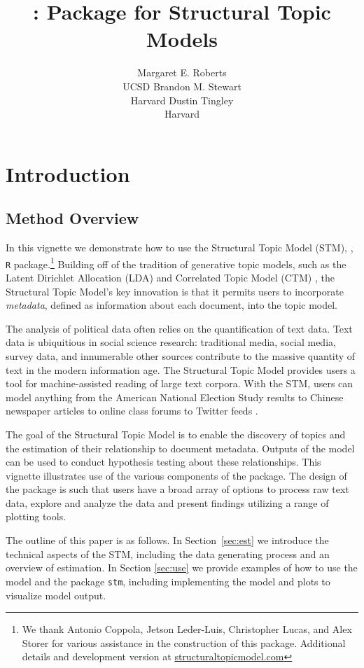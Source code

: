 \documentclass[nojss]{jss}
\author{\hspace{1.1in}Margaret E. Roberts\\\hspace{1.1in}UCSD \And
  \hspace{1.5in}Brandon M. Stewart\\\hspace{1.5in}Harvard \And
  \hspace{1.5in}Dustin Tingley\\\hspace{1.5in}Harvard \And
}
\title{\pkg{stm}: \proglang{R} Package for Structural Topic Models}
\newcommand\spacingset[1]{\renewcommand{\baselinestretch}{#1}\small\normalsize}
\begin{document}

\spacingset{1.5}

\section{Introduction}
\subsection{Method Overview}

In this vignette we demonstrate how to use the Structural Topic Model (STM), , \texttt{R} package.\footnote{We thank Antonio Coppola, Jetson Leder-Luis, Christopher Lucas, and Alex Storer for various assistance in the construction of this package.  Additional details and development version at \url{structuraltopicmodel.com}} Building off of the tradition of generative topic models, such as the Latent Dirichlet Allocation (LDA) \citep{blei2003latent} and Correlated Topic Model (CTM) \citep{blei2007correlated}, the Structural Topic Model's key innovation is that it permits users to incorporate \emph{metadata}, defined as information about each document, into the topic model.

The analysis of political data often relies on the quantification of text data. Text data is ubiquitious in social science research: traditional media, social media, survey data, and innumerable other sources contribute to the massive quantity of text in the modern information age.  The Structural Topic Model provides users a tool for machine-assisted reading of large text corpora.  With the STM, users can model anything from the American National Election Study results \citep{ajps} to Chinese newspaper articles \citep{robertsstewartchina} to online class forums \cite{StudentText} to Twitter feeds \citep{TextComparative}.

The goal of the Structural Topic Model is to enable the discovery of topics and the estimation of their relationship to document metadata. Outputs of the model can be used to conduct hypothesis testing about these relationships. This vignette illustrates use of the various components of the package. The design of the package is such that users have a broad array of options to process raw text data, explore and analyze the data and present findings utilizing a range of plotting tools.

The outline of this paper is as follows. In Section~\ref{sec:est} we introduce the technical aspects of the STM, including the data generating process and an overview of estimation.  In Section \ref{sec:use} we provide examples of how to use the model and the package \texttt{stm}, including implementing the model and plots to visualize model output.
\end{document}
